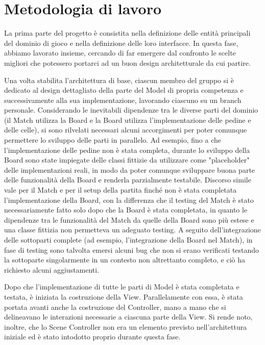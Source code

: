 \documentclass[a4paper,12pt]{report}
\begin{document}
\section{Metodologia di lavoro}

La prima parte del progetto è consistita nella definizione delle entità principali del dominio di gioco e nella definizione delle loro interfacce. In questa fase, abbiamo lavorato insieme, cercando di far emergere dal confronto le scelte migliori che potessero portarci ad un buon design architetturale da cui partire. 

Una volta stabilita l'architettura di base, ciascun membro del gruppo si è dedicato al design dettagliato della parte del Model di propria competenza e successivamente alla sua implementazione, lavorando ciascuno su un branch personale. Considerando le inevitabili dipendenze tra le diverse parti del dominio (il Match utilizza la Board e la Board utilizza l'implementazione delle pedine e delle celle), si sono rilvelati necessari alcuni accorgimenti per poter comunque permettere lo sviluppo delle parti in parallelo. Ad esempio, fino a che l'implementazione delle pedine non è stata completa, durante lo sviluppo della Board sono state impiegate delle classi fittizie da utilizzare come "placeholder" delle implementazioni reali, in modo da poter comunque sviluppare buona parte delle funzionalità della Board e renderla parzialmente testabile. Discorso simile vale per il Match e per il setup della partita finché non è stata completata l'implementazione della Board, con la differenza che il testing del Match è stato necessariamente fatto solo dopo che la Board è stata completata, in quanto le dipendenze tra le funzionalità del Match da quelle della Board sono più estese e una classe fittizia non permetteva un adeguato testing. A seguito dell'integrazione delle sottoparti complete (ad esempio, l'integrazione della Board nel Match), in fase di testing sono talvolta emersi alcuni bug che non si erano verificati testando la sottoparte singolarmente in un contesto non altrettanto completo, e ciò ha richiesto alcuni aggiustamenti.

Dopo che l'implementazione di tutte le parti di Model è stata completata e testata, è iniziata la costruzione della View. Parallelamente con essa, è stata portata avanti anche la costruzione del Controller, mano a mano che si delineavano le interazioni necessarie a ciascuna parte della View. Si rende noto, inoltre, che lo Scene Controller non era un elemento previsto nell'architettura iniziale ed è stato intodotto proprio durante questa fase.
\end{document}
